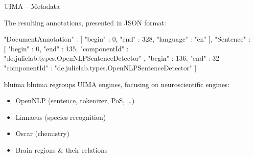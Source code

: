 \documentclass[10pt, compress, xcolor={usenames,dvipsnames}]{beamer}
\newcommand{\SmallArrow}{\ding{228}}
\newcommand{\BigArrow}{$\Longrightarrow$} %
\renewcommand{\emph}[1]{\alert{#1}}
\begin{document}
%
%
%
%


\begin{frame}[fragile]{UIMA -- Metadata}

  The resulting annotations, presented in JSON format:

  \vspace{1em}

  \begin{lstjson}
"DocumentAnnotation" : [
  { "begin" : 0,    "end" : 328,  "language" : "en" }
],
"Sentence" : [
  { "begin" : 0,    "end" : 135,
    "componentId" :
        "de.julielab.types.OpenNLPSentenceDetector" },
  { "begin" : 136,  "end" : 32
    "componentId" :
        "de.julielab.types.OpenNLPSentenceDetector" }
]
  \end{lstjson}

\end{frame}

\begin{frame}[fragile]{bluima}
  bluima regroups UIMA engines, focusing on neuroscientific engines:

  \begin{itemize}[label=\SmallArrow]

    \item OpenNLP (sentence, tokenizer, PoS, \ldots)

    \item Linnaeus (species recognition)

    \item Oscar (chemistry)

    \item \emph{Brain regions \& their relations}

  \end{itemize}

\end{frame}
\end{document}

